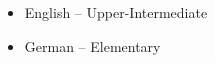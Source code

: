 




\divider



\divider




\begin{itemize}
	\item English -- Upper-Intermediate
    \item German -- Elementary
\end{itemize}










